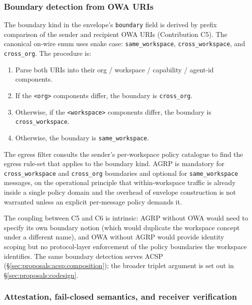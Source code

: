 \subsubsection{Boundary detection from OWA URIs}
\label{sec:proposals:agrp:boundary}

The boundary kind in the envelope's \texttt{boundary}
field is derived by prefix comparison of the sender and
recipient OWA URIs (Contribution C5). The canonical
on-wire enum uses snake case:
\texttt{same\_workspace}, \texttt{cross\_workspace}, and
\texttt{cross\_org}. The procedure is:

\begin{enumerate}
  \item Parse both URIs into their org / workspace /
    capability / agent-id components.
  \item If the \texttt{<org>} components differ, the
    boundary is \texttt{cross\_org}.
  \item Otherwise, if the \texttt{<workspace>} components
    differ, the boundary is \texttt{cross\_workspace}.
  \item Otherwise, the boundary is \texttt{same\_workspace}.
\end{enumerate}

The egress filter consults the sender's per-workspace
policy catalogue to find the egress rule-set that
applies to the boundary kind. AGRP is mandatory for
\texttt{cross\_workspace} and \texttt{cross\_org}
boundaries and optional for \texttt{same\_workspace}
messages, on the operational principle that
within-workspace traffic is already inside a single
policy domain and the overhead of envelope construction
is not warranted unless an explicit per-message policy
demands it.

The coupling between C5 and C6 is intrinsic: AGRP
without OWA would need to specify its own boundary
notion (which would duplicate the workspace concept
under a different name), and OWA without AGRP would
provide identity scoping but no protocol-layer
enforcement of the policy boundaries the workspace
identifies. The same boundary detection serves ACSP
(\S\ref{sec:proposals:acsp:composition}); the
broader triplet argument is set out in
\S\ref{sec:proposals:codesign}.

\subsubsection{Attestation, fail-closed semantics, and receiver verification}
\label{sec:proposals:agrp:attestation}

